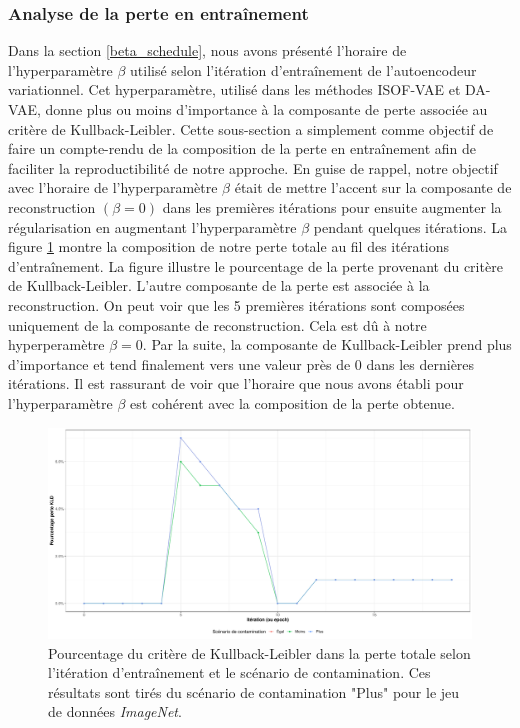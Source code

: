 \subsubsection{Analyse de la perte en entraînement}

Dans la section \ref{beta_schedule}, nous avons présenté l'horaire de l'hyperparamètre $\beta$ utilisé selon l'itération d'entraînement de l'autoencodeur variationnel. Cet hyperparamètre, utilisé dans les méthodes ISOF-VAE et DA-VAE, donne plus ou moins d'importance à la composante de perte associée au critère de Kullback-Leibler. Cette sous-section a simplement comme objectif de faire un compte-rendu de la composition de la perte en entraînement afin de faciliter la reproductibilité de notre approche. En guise de rappel, notre objectif avec l'horaire de l'hyperparamètre $\beta$ était de mettre l'accent sur la composante de reconstruction $(\beta = 0)$ dans les premières itérations pour ensuite augmenter la régularisation en augmentant l'hyperparamètre $\beta$ pendant quelques itérations. La figure \ref{fig:cars_kld_perc} montre la composition de notre perte totale au fil des itérations d'entraînement. La figure illustre le pourcentage de la perte provenant du critère de Kullback-Leibler. L'autre composante de la perte est associée à la reconstruction. On peut voir que les 5 premières itérations sont composées uniquement de la composante de reconstruction. Cela est dû à notre hyperperamètre $\beta=0$. Par la suite, la composante de Kullback-Leibler prend plus d'importance et tend finalement vers une valeur près de 0 dans les dernières itérations. Il est rassurant de voir que l'horaire que nous avons établi pour l'hyperparamètre $\beta$ est cohérent avec la composition de la perte obtenue.

\begin{figure}[H]
	\centering
	\includegraphics[width=\linewidth]{images/kld_cars.pdf}
	\caption{Pourcentage du critère de Kullback-Leibler dans la perte totale selon l'itération d'entraînement et le scénario de contamination. Ces résultats sont tirés du scénario de contamination "Plus" pour le jeu de données \textit{ImageNet}.}
	\label{fig:cars_kld_perc}
\end{figure}


